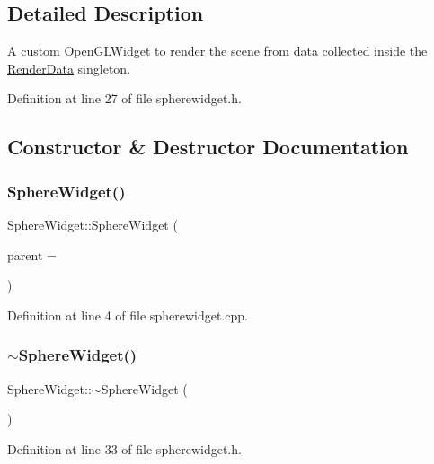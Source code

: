 \subsection{Detailed Description}
A custom Open\+G\+L\+Widget to render the scene from data collected inside the \hyperlink{class_render_data}{Render\+Data} singleton. 

Definition at line 27 of file spherewidget.\+h.



\subsection{Constructor \& Destructor Documentation}
\mbox{\label{class_sphere_widget_a6ee7b3a4b58e5d62fb1c901aafdd1790}} 
\subsubsection{\texorpdfstring{Sphere\+Widget()}{SphereWidget()}}
{\footnotesize\ttfamily Sphere\+Widget\+::\+Sphere\+Widget (\begin{DoxyParamCaption}\item[{Q\+Widget $\ast$}]{parent = {} }\end{DoxyParamCaption})}



Definition at line 4 of file spherewidget.\+cpp.

\mbox{\label{class_sphere_widget_a1766e5d68f4c57f52d6b1ee40cc0326c}} 
\subsubsection{\texorpdfstring{$\sim$\+Sphere\+Widget()}{~SphereWidget()}}
{\footnotesize\ttfamily Sphere\+Widget\+::$\sim$\+Sphere\+Widget (\begin{DoxyParamCaption}{ }\end{DoxyParamCaption})\hspace{0.3cm}{\ttfamily [inline]}}



Definition at line 33 of file spherewidget.\+h.



